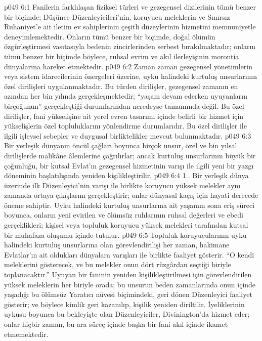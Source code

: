 \vs p049 6:1 Fanilerin farklılaşan fiziksel türleri ve gezegensel dizilerinin tümü benzer bir biçimde; Düşünce Düzenleyicileri’nin, koruyucu meleklerin ve Sınırsız Ruhaniyet’e ait iletim ev sahiplerinin çeşitli düzeylerinin hizmetini memnuniyetle deneyimlemektedir. Onların tümü benzer bir biçimde, doğal ölümün özgürleştirmesi vasıtasıyla bedenin zincirlerinden serbest bırakılmaktadır; onların tümü benzer bir biçimde böylece, ruhsal evrim ve akıl ilerleyişinin morontia dünyalarına hareket etmektedir.
\vs p049 6:2 Zaman zaman gezegensel yönetimlerin veya sistem idarecilerinin önergeleri üzerine, uyku halindeki kurtuluş unsurlarının özel dirilişleri uygulanmaktadır. Bu türden dirilişler, gezegensel zamanın en azından her bin yılında gerçekleşmektedir; “yaşam devam ederken uyuyanların birçoğunun” gerçekleştiği durumlarından neredeyse tamamında değil. Bu özel dirilişler, fani yükselişine ait yerel evren tasarımı içinde belirli bir hizmet için yükselişlerin özel topluluklarını yönlendirme durumlarıdır. Bu özel dirilişler ile ilgili işlevsel sebepler ve duygusal birliktelikler mevcut bulunmaktadır.
\vs p049 6:3 Bir yerleşik dünyanın öncül çağları boyunca birçok unsur, özel ve bin yılsal dirilişlerde malikâne âlemlerine çağrılırlar; ancak kurtuluş unsurlarının büyük bir çoğunluğu, bir kutsal Evlat’ın gezegensel hizmetinin varışı ile ilgili yeni bir yazgı döneminin başlatılışında yeniden kişilikleştirilir.
\vs p049 6:4 1.\bibnobreakspace {}. Bir yerleşik dünya üzerinde ilk Düzenleyici’nin varışı ile birlikte koruyucu yüksek melekler aynı zamanda ortaya çıkışlarını gerçekleştirir; onlar dünyasal kaçış için hayati derecede öneme sahiptir. Uyku halindeki kurtuluş unsurlarına ait yaşamın sona eriş süreci boyunca, onların yeni evirilen ve ölümsüz ruhlarının ruhsal değerleri ve ebedi gerçeklikleri; kişisel veya topluluk koruyucu yüksek melekleri tarafından kutsal bir muhafaza oluşumu içinde tutulur.
\vs p049 6:5 Topluluk koruyucularının uyku halindeki kurtuluş unsurlarına olan görevlendirilişi her zaman, hakimane Evlatlar’ın ait oldukları dünyalara varışları ile birlikte faaliyet gösterir. “O kendi meleklerini gösterecek, ve bu melekler onun dört rüzgârdan seçtiği biriyle toplanacaktır.” Uyuyan bir faninin yeniden kişilikleştirilmesi için görevlendirilen yüksek meleklerin her biriyle orada; bu unsurun beden zamanlarında onun içinde yaşadığı bu ölümsüz Yaratıcı nüvesi biçimindeki, geri dönen Düzenleyici faaliyet gösterir; ve böylece kimlik geri kazanılıp, kişilik yeniden diriltilir. İyeliklerinin uykusu boyunca bu bekleyişte olan Düzenleyiciler, Divinington’da hizmet eder; onlar hiçbir zaman, bu ara süreç içinde başka bir fani akıl içinde ikamet etmemektedir.
